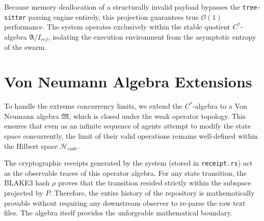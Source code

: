 Because memory deallocation of a structurally invalid payload bypasses the \texttt{tree-sitter} parsing engine entirely, this projection guarantees true $\mathcal{O}(1)$ performance. The system operates exclusively within the stable quotient $C^*$-algebra $\mathfrak{A}/I_{ref}$, isolating the execution environment from the asymptotic entropy of the swarm.

\section{Von Neumann Algebra Extensions}

To handle the extreme concurrency limits, we extend the $C^*$-algebra to a Von Neumann algebra $\mathfrak{M}$, which is closed under the weak operator topology. This ensures that even as an infinite sequence of agents attempt to modify the state space concurrently, the limit of their valid operations remains well-defined within the Hilbert space $\mathcal{H}_{code}$.

The cryptographic receipts generated by the system (stored in \texttt{receipt.rs}) act as the observable traces of this operator algebra. For any state transition, the BLAKE3 hash $\rho$ proves that the transition resided strictly within the subspace projected by $P$. Therefore, the entire history of the repository is mathematically provable without requiring any downstream observer to re-parse the raw text files. The algebra itself provides the unforgeable mathematical boundary.
